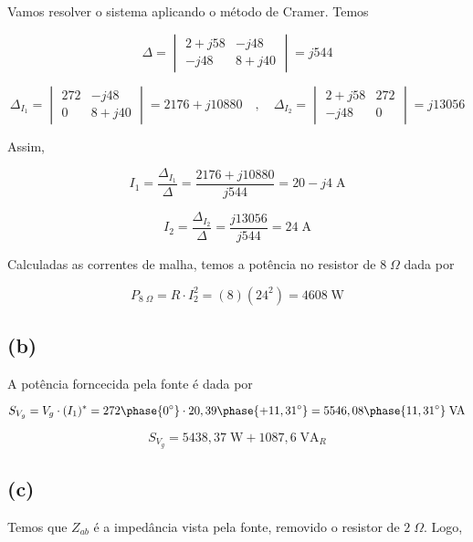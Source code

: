 \endgroup

Vamos resolver o sistema aplicando o método de Cramer. Temos

\begingroup
\renewcommand*{\arraystretch}{3}

\[ 
    \Delta
    =
    \begin{vmatrix}
        2 + j58 & -j48    \\
        -j48    & 8 + j40
    \end{vmatrix}
    =
    j544
\]

\[
    \Delta_{I_1}
    =
    \begin{vmatrix}
        272 & -j48    \\
        0    & 8 + j40
    \end{vmatrix}
    =
    2176 + j10880  \quad , \quad 
    \Delta_{I_2}
    =
    \begin{vmatrix}
        2 + j58 & 272    \\
        -j48    & 0
    \end{vmatrix}
    =
    j13056
\]

\endgroup

Assim, 

\[ I_1 = \frac{\Delta_{I_1}}{\Delta} = \frac{2176 + j10880}{j544} = 20 - j4 \;\textrm{A} \]

\[ I_2 = \frac{\Delta_{I_2}}{\Delta} = \frac{j13056}{j544} = 24 \;\textrm{A} \]

Calculadas as correntes de malha, temos a potência no resistor de $8 \;\Omega$ dada por

\[ \boxed{P_{8 \;\Omega} = R \cdot I_2^2 = (8)(24^2) = 4608 \;\textrm{W}}  \]

\subsection*{(b)}

A potência forncecida pela fonte é dada por

\[ S_{V_g} = V_g \cdot (I_1)^* = 272\phase{0^{\circ}} \cdot 20,39\phase{+11,31^{\circ}} = 5546,08\phase{11,31^{\circ}} \;\textrm{VA} \]

\[ \boxed{S_{V_g} = 5438,37 \;\textrm{W} + 1087,6 \;\textrm{VA}_R} \]

\subsection*{(c)}

Temos que $Z_{ab}$ é a impedância vista pela fonte, removido o resistor de $2 \;\Omega$. Logo,

